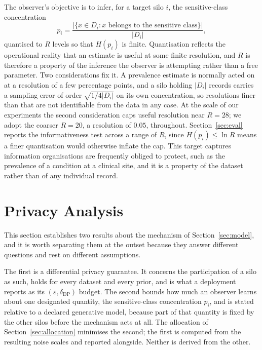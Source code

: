 \documentclass[acmsmall,screen,review,anonymous]{acmart}
\theoremstyle{acmdefinition}%
\begin{document}
The observer's objective is to infer, for a target silo $i$, the sensitive-class
concentration
\begin{equation}
p_i = \frac{\big|\{x \in D_i : x \text{ belongs to the sensitive class}\}\big|}{|D_i|},
\end{equation}
quantised to $R$ levels so that $H(p_i)$ is finite. Quantisation reflects the
operational reality that an estimate is useful at some finite resolution, and $R$
is therefore a property of the inference the observer is attempting rather than a
free parameter. Two considerations fix it. A prevalence estimate is normally acted
on at a resolution of a few percentage points, and a silo holding $|D_i|$ records
carries a sampling error of order $\sqrt{1/4|D_i|}$ on its own concentration, so
resolutions finer than that are not identifiable from the data in any case. At the
scale of our experiments the second consideration caps useful resolution near
$R = 28$; we adopt the coarser $R = 20$, a resolution of $0.05$, throughout.
Section~\ref{sec:eval} reports the informativeness test across a range of $R$, since
$H(p_i) \le \ln R$ means a finer quantisation would otherwise inflate the cap. This
target captures information organisations are frequently obliged to protect, such
as the prevalence of a condition at a clinical site, and it is a property of the
dataset rather than of any individual record.

\section{Privacy Analysis}
\label{sec:theory}

This section establishes two results about the mechanism of
Section~\ref{sec:model}, and it is worth separating them at the outset because
they answer different questions and rest on different assumptions.

The first is a differential privacy guarantee. It concerns the participation of a
silo as such, holds for every dataset and every prior, and is what a deployment
reports as its $(\varepsilon, \delta_{\mathrm{DP}})$ budget. The second bounds how
much an observer learns about one designated quantity, the sensitive-class
concentration $p_i$, and is stated relative to a declared generative model,
because part of that quantity is fixed by the other silos before the mechanism
acts at all. The allocation of Section~\ref{sec:allocation} minimises the second;
the first is computed from the resulting noise scales and reported alongside.
Neither is derived from the other.
\end{document}
